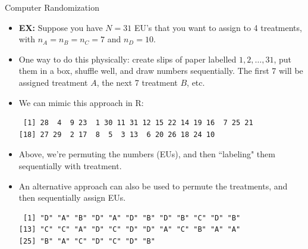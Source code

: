 \begin{frame}{Computer Randomization}
\begin{itemize}
\end{itemize}
  
  \framebreak
  
  \begin{itemize}
    \item \textbf{EX:} Suppose you have $N = 31$ EU's that you want to assign to 4 treatments, with $n_A = n_B = n_C = 7$ and $n_D = 10$. 
    \item One way to do this physically: create slips of paper labelled $1, 2, \ldots, 31$, put them in a box, shuffle well, and draw numbers sequentially. The first 7 will be assigned treatment $A$, the next 7 treatment $B$, etc.
    \item We can mimic this approach in R:
  
\begin{knitrout}\small
{}\color{fgcolor}\begin{kframe}
\begin{alltt}
\hldef{(}\hldef{)}
\hldef{(}\hlopt{:}\hldef{)}  
\end{alltt}
\begin{verbatim}
 [1] 28  4  9 23  1 30 11 31 12 15 22 14 19 16  7 25 21
[18] 27 29  2 17  8  5  3 13  6 20 26 18 24 10
\end{verbatim}
\end{kframe}
\end{knitrout}
  
\framebreak

  \item Above, we're permuting the numbers (EUs), and then ``labeling" them sequentially with treatment.
  \item An alternative approach can also be used to permute the treatments, and then sequentially assign EUs.

\begin{knitrout}\small
{}\color{fgcolor}\begin{kframe}
\begin{alltt}
\hldef{(}\hldef{)}
 \hlkwb{<-} \hldef{(}
  \hldef{(}\hldef{,} \hldef{),} \hldef{(}\hldef{,} \hldef{),}
  \hldef{(}\hldef{,} \hldef{),} \hldef{(}\hldef{,} \hldef{)}
  \hldef{)}
\end{alltt}
\begin{verbatim}
 [1] "D" "A" "B" "D" "A" "D" "B" "D" "B" "C" "D" "B"
[13] "C" "C" "A" "D" "C" "D" "D" "A" "C" "B" "A" "A"
[25] "B" "A" "C" "D" "C" "D" "B"
\end{verbatim}
\end{kframe}
\end{knitrout}


\end{itemize}
\end{frame}
